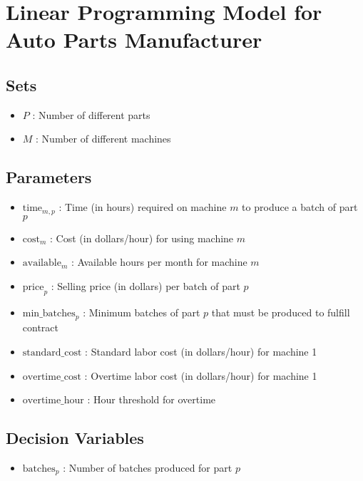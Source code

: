 \documentclass{article}
\begin{document}
\section*{Linear Programming Model for Auto Parts Manufacturer}

\subsection*{Sets}
\begin{itemize}
    \item \( P \) : Number of different parts
    \item \( M \) : Number of different machines
\end{itemize}

\subsection*{Parameters}
\begin{itemize}
    \item \( \text{time}_{m,p} \) : Time (in hours) required on machine \( m \) to produce a batch of part \( p \)
    \item \( \text{cost}_{m} \) : Cost (in dollars/hour) for using machine \( m \)
    \item \( \text{available}_{m} \) : Available hours per month for machine \( m \)
    \item \( \text{price}_{p} \) : Selling price (in dollars) per batch of part \( p \)
    \item \( \text{min\_batches}_{p} \) : Minimum batches of part \( p \) that must be produced to fulfill contract
    \item \( \text{standard\_cost} \) : Standard labor cost (in dollars/hour) for machine 1
    \item \( \text{overtime\_cost} \) : Overtime labor cost (in dollars/hour) for machine 1
    \item \( \text{overtime\_hour} \) : Hour threshold for overtime
\end{itemize}

\subsection*{Decision Variables}
\begin{itemize}
    \item \( \text{batches}_{p} \) : Number of batches produced for part \( p \)
\end{itemize}
\end{document}
